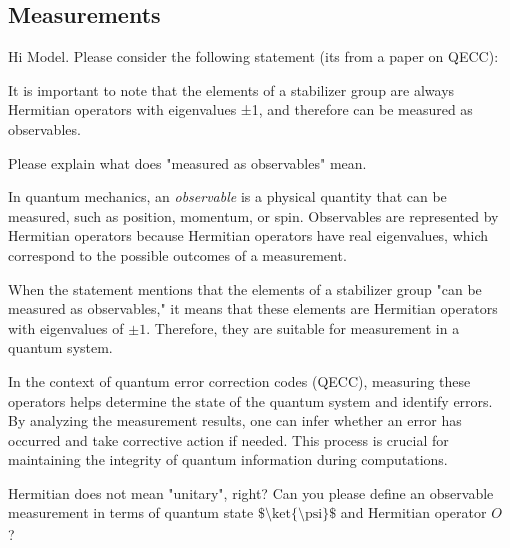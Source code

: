 \subsection{Measurements}

\begin{ai}
Hi Model. Please consider the following statement (its from a paper on QECC):


It is important to note that the elements of a stabilizer group are always
Hermitian operators with eigenvalues ±1, and therefore can be measured as observables.

Please explain what does "measured as observables" mean.
\end{ai}

\begin{airesult}
In quantum mechanics, an \textit{observable} is a physical quantity that can be measured, such as
position, momentum, or spin. Observables are represented by Hermitian operators because Hermitian
operators have real eigenvalues, which correspond to the possible outcomes of a measurement.

\vsp

When the statement mentions that the elements of a stabilizer group "can be measured as
observables," it means that these elements are Hermitian operators with eigenvalues of \( \pm 1 \).
Therefore, they are suitable for measurement in a quantum system.

\vsp

In the context of quantum error correction codes (QECC), measuring these operators helps determine
the state of the quantum system and identify errors. By analyzing the measurement results, one can
infer whether an error has occurred and take corrective action if needed. This process is crucial
for maintaining the integrity of quantum information during computations.
\end{airesult}


\begin{ai}
Hermitian does not mean "unitary", right?
Can you please define an observable measurement in terms of quantum state $\ket{\psi}$ and
Hermitian operator $O$ ?
\end{ai}

